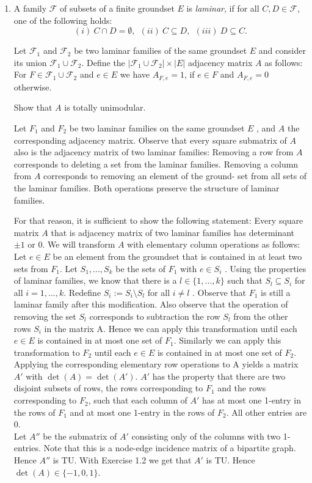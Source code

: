 \documentclass[11pt]{article}
\begin{document}
\begin{enumerate}[1)]
\item A family $\mathcal{F}$ of subsets of a finite groundset $E$ is
\emph{laminar}, if for all  $C,D\in \mathcal{F}$, one of the following holds:
$$ (i)~C\cap D = \emptyset,~~(ii)~C \subseteq D,~~(iii)~D\subseteq C. $$

Let $\mathcal{F}_1$ and $\mathcal{F}_2$ be two laminar families of the same groundset $E$ and consider its union $\mathcal{F}_1\cup\mathcal{F}_2$.
Define the $|\mathcal{F}_1\cup\mathcal{F}_2|\times |E|$ adjacency matrix $A$ as follows:
For $F\in\mathcal{F}_1\cup\mathcal{F}_2$ and $e\in E$ we have
$A_{F,e}=1$, if $e\in F$ and $A_{F,e}=0$ otherwise.

Show that $A$ is totally unimodular.

\begin{solution}
Let $F_1$ and $F_2$ be two laminar families on the same groundset $E$ , and $A$ the corresponding
adjacency matrix. Observe that every square submatrix of $A$ also is the adjacency matrix of
two laminar families: Removing a row from $A$ corresponds to deleting a set from the laminar
families. Removing a column from $A$ corresponds to removing an element of the ground-
set from all sets of the laminar families. Both operations preserve the structure of laminar
families.


For that reason, it is sufficient to show the following statement: Every square matrix $A$ that
is adjacency matrix of two laminar families has determinant $±1$ or $0$.
We will transform $A$ with elementary column operations as follows: Let $e ∈ E$ be an element from the groundset that is contained in at least two sets from $F_1$. Let $S_1,...,S_k$ be
the sets of $F_1$ with $e ∈ S_i$ . Using the properties of laminar families, we know that there is a
$l ∈ \{1,...,k\}$ such that $S_l ⊆ S_i$ for all $i= 1,...,k$. Redefine $S_i := S_i \setminus S_l$ for all $i\neq l$ . Observe
that $F_1$ is still a laminar family after this modification. Also observe that the operation of removing the set $S_l$ corresponds to subtraction the row $S_l$ from the other rows $S_i$ in the matrix
A.
Hence we can apply this transformation until each $e ∈ E$ is contained in at most one set of
$F_1$. Similarly we can apply this transformation to $F_2$ until each $e ∈ E$ is contained in at most
one set of $F_2$. Applying the corresponding elementary row operations to A yields a matrix
$A'$ with $\det(A)= \det(A')$.  $A'$ has the property that there are two disjoint subsets of rows, the
rows corresponding to $F_1$ and the rows corresponding to $F_2$, such that each column of $A'$
has at most one 1-entry in the rows of $F_1$ and at most one 1-entry in the rows of $F_2$. All other
entries are $0$.\\
Let $A''$ be the submatrix of $A'$ consisting only of the columns with two 1-entries. Note
that this is a node-edge incidence matrix of a bipartite graph. Hence $A''$ is TU. With Exercise 1.2 we get that $A'$ is TU. Hence $\det(A) ∈ \{−1,0,1\}$.
\end{solution}


\end{enumerate}
\end{document}
